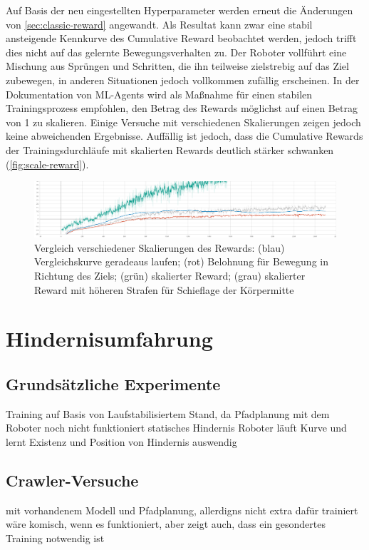 Auf Basis der neu eingestellten Hyperparameter werden erneut die Änderungen von \autoref{sec:classic-reward} angewandt.
Als Resultat kann zwar eine stabil ansteigende Kennkurve des Cumulative Reward beobachtet werden, jedoch trifft dies nicht auf das gelernte Bewegungsverhalten zu.
Der Roboter vollführt eine Mischung aus Sprüngen und Schritten, die ihn teilweise zielstrebig auf das Ziel zubewegen, in anderen Situationen jedoch vollkommen zufällig erscheinen.
In der Dokumentation von ML-Agents wird als Maßnahme für einen stabilen Trainingsprozess empfohlen, den Betrag des Rewards möglichst auf einen Betrag von 1 zu skalieren.
Einige Versuche mit verschiedenen Skalierungen zeigen jedoch keine abweichenden Ergebnisse.
Auffällig ist jedoch, dass die Cumulative Rewards der Trainingsdurchläufe mit skalierten Rewards deutlich stärker schwanken (\autoref{fig:scale-reward}).

\begin{figure}
    \centering
    \includegraphics[width = \textwidth]{Bilder/ml-agents/Environment_Cumulative Reward-scale-reward.pdf}
    \caption[Vergleich verschiedener Skalierungen des Rewards]{Vergleich verschiedener Skalierungen des Rewards: (blau) Vergleichskurve geradeaus laufen; (rot) Belohnung für Bewegung in Richtung des Ziels; (grün) skalierter Reward; (grau) skalierter Reward mit höheren Strafen für Schieflage der Körpermitte}
    \label{fig:scale-reward}
\end{figure}

\section{Hindernisumfahrung}
\subsection{Grundsätzliche Experimente}
Training auf Basis von Laufstabilisiertem Stand, da Pfadplanung mit dem Roboter noch nicht funktioniert
statisches Hindernis
Roboter läuft Kurve und lernt Existenz und Position von Hindernis auswendig
\subsection{Crawler-Versuche}
mit vorhandenem Modell und Pfadplanung, allerdigns nicht extra dafür trainiert
wäre komisch, wenn es funktioniert, aber zeigt auch, dass ein gesondertes Training notwendig ist